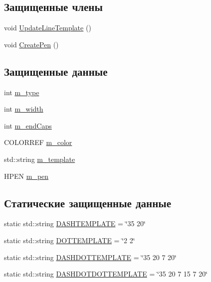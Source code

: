 \subsection*{Защищенные члены}
\begin{DoxyCompactItemize}
\item 
void \hyperlink{class_line_data_a95fa94b2614d7058386f82e7c3a2a96d}{Update\-Line\-Template} ()
\item 
void \hyperlink{class_line_data_aeb4bfdd0dc43e28b44efe5726b3b7621}{Create\-Pen} ()
\end{DoxyCompactItemize}
\subsection*{Защищенные данные}
\begin{DoxyCompactItemize}
\item 
int \hyperlink{class_line_data_a67b36139f7b94ec45cbb434cf597ec09}{m\-\_\-type}
\item 
int \hyperlink{class_line_data_a2f510fa43948464d6764fc3e117b5006}{m\-\_\-width}
\item 
int \hyperlink{class_line_data_a671e8aa8a421242fd1a16bf7759220fa}{m\-\_\-end\-Caps}
\item 
C\-O\-L\-O\-R\-R\-E\-F \hyperlink{class_line_data_a641038e14c82d7641df6b1f2e1fd7590}{m\-\_\-color}
\item 
std\-::string \hyperlink{class_line_data_ab1383399938d3d85c3f3b1caa488f322}{m\-\_\-template}
\item 
H\-P\-E\-N \hyperlink{class_line_data_a2774a276fe32645f8d0b44a3032fbf48}{m\-\_\-pen}
\end{DoxyCompactItemize}
\subsection*{Статические защищенные данные}
\begin{DoxyCompactItemize}
\item 
static std\-::string \hyperlink{class_line_data_a19e0f6bc94691eee641daf9a12e37cb0}{D\-A\-S\-H\-T\-E\-M\-P\-L\-A\-T\-E} = \char`\"{}35 20\char`\"{}
\item 
static std\-::string \hyperlink{class_line_data_aabe10496e27e0f52cf6487551c4cb134}{D\-O\-T\-T\-E\-M\-P\-L\-A\-T\-E} = \char`\"{}2 2\char`\"{}
\item 
static std\-::string \hyperlink{class_line_data_aa8a68011b56ff20d76323e1d38929699}{D\-A\-S\-H\-D\-O\-T\-T\-E\-M\-P\-L\-A\-T\-E} = \char`\"{}35 20 7 20\char`\"{}
\item 
static std\-::string \hyperlink{class_line_data_ada248a7a1094de4b553f165ebafb8e9f}{D\-A\-S\-H\-D\-O\-T\-D\-O\-T\-T\-E\-M\-P\-L\-A\-T\-E} = \char`\"{}35 20 7 15 7 20\char`\"{}
\end{DoxyCompactItemize}


